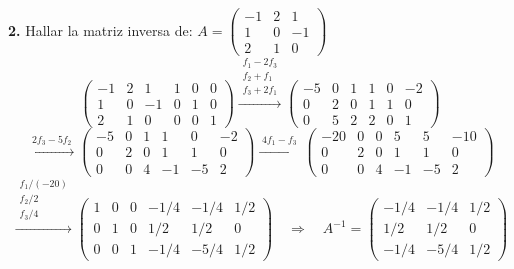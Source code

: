 \documentclass[11pt,a4paper]{article}
\begin{document}
\textbf{2.} Hallar la matriz inversa de: \quad
$A = \begin{pmatrix} -1 & 2 & 1\\ 1 & 0 & -1\\ 2 & 1 & 0\end{pmatrix}$
\[
\left(\begin{array}{ccc|ccc}
-1 & 2 & 1 & 1 & 0 & 0\\
1 & 0 & -1 & 0 & 1 & 0\\
2 & 1 & 0 & 0 & 0 & 1
\end{array}\right)
\xrightarrow{\substack{f_1 - 2f_3\\ f_2 + f_1\\ f_3 + 2f_1}}
\left(\begin{array}{ccc|ccc}
-5 & 0 & 1 & 1 & 0 & -2\\
0 & 2 & 0 & 1 & 1 & 0\\
0 & 5 & 2 & 2 & 0 & 1
\end{array}\right)
\]
\[
\xrightarrow{\;2f_3 - 5f_2\;}
\left(\begin{array}{ccc|ccc}
-5 & 0 & 1 & 1 & 0 & -2\\
0 & 2 & 0 & 1 & 1 & 0\\
0 & 0 & 4 & -1 & -5 & 2
\end{array}\right)
\xrightarrow{\;4f_1 - f_3\;}
\left(\begin{array}{ccc|ccc}
-20 & 0 & 0 & 5 & 5 & -10\\
0 & 2 & 0 & 1 & 1 & 0\\
0 & 0 & 4 & -1 & -5 & 2
\end{array}\right)
\]
\[
\xrightarrow{\substack{f_1/(-20)\\ f_2/2\\ f_3/4}}
\left(\begin{array}{ccc|ccc}
1 & 0 & 0 & -1/4 & -1/4 & 1/2\\
0 & 1 & 0 & 1/2 & 1/2 & 0\\
0 & 0 & 1 & -1/4 & -5/4 & 1/2
\end{array}\right)
\quad\Rightarrow\quad
A^{-1} = \begin{pmatrix} -1/4 & -1/4 & 1/2\\ 1/2 & 1/2 & 0\\ -1/4 & -5/4 & 1/2\end{pmatrix}
\]
\end{document}
